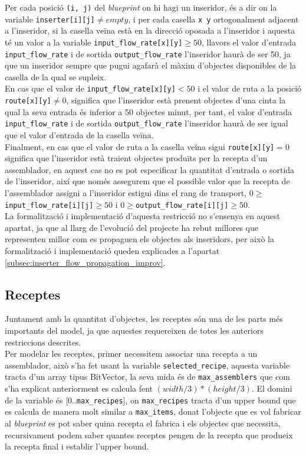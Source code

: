 Per cada posició \lstinline{(i, j)} del \textit{blueprint} on hi hagi un inseridor, és a dir on la variable \lstinline{inserter[i][j]}$\neq empty$, i per cada casella \lstinline{x y} ortogonalment adjacent a l'inseridor, si la casella veïna està en la direcció oposada a l'inseridor i aquesta té un valor a la variable \lstinline{input_flow_rate[x][y]}$\geq50$, llavors el valor d'entrada \lstinline{input_flow_rate} i de sortida \lstinline{output_flow_rate} l'inseridor haurà de ser 50, ja que un inseridor sempre que pugui agafarà el màxim d'objectes disponibles de la casella de la qual se supleix.\\

En cas que el valor de \lstinline{input_flow_rate[x][y]}$<50$ i el valor de ruta a la posició \lstinline{route[x][y]}$\neq0$, significa que l'inseridor està prenent objectes d'una cinta la qual la seva entrada és inferior a 50 objectes minut, per tant, el valor d'entrada \lstinline{input_flow_rate} i de sortida \lstinline{output_flow_rate} l'inseridor haurà de ser igual que el valor d'entrada de la casella veïna.\\

Finalment, en cas que el valor de ruta a la casella veïna sigui \lstinline{route[x][y]}$=0$ significa que l'inseridor està traient objectes produïts per la recepta d'un assemblador, en aquest cas no es pot especificar la quantitat d'entrada o sortida de l'inseridor, així que només assegurem que el possible valor que la recepta de l'assemblador assigni a l'inseridor estigui dins el rang de transport, $0\ge$\lstinline{input_flow_rate[i][j]}$\ge50$ i $0\ge$\lstinline{output_flow_rate[i][j]}$\ge50$.\\
La formalització i implementació d'aquesta restricció no s'ensenya en aquest apartat, ja que al llarg de l'evolució del projecte ha rebut millores que representen millor com es propaguen els objectes als inseridors, per això la formalització i implementació queden explicades a l'apartat \ref{subsec:inserter_flow_propagation_improv}.

\subsection{Receptes}
Juntament amb la quantitat d'objectes, les receptes són una de les parts més importants del model, ja que aquestes requereixen de totes les anteriors restriccions descrites.\\

Per modelar les receptes, primer necessitem associar una recepta a un assemblador, això s'ha fet usant la variable \lstinline{selected_recipe}, aquesta variable tracta d'un array tipus BitVector, la seva mida és de \lstinline{max_assemblers} que com s'ha explicat anteriorment es calcula fent $(width/3) * (height/3)$. El domini de la variable és  [0..\lstinline{max_recipes}], on \lstinline{max_recipes} tracta d'un upper bound que es calcula de manera molt similar a \lstinline{max_items}, donat l'objecte que es vol fabricar al \textit{blueprint} es pot saber quina recepta el fabrica i els objectes que necessita, recursivament podem saber quantes receptes pengen de la recepta que produeix la recepta final i establir l'upper bound.\\

